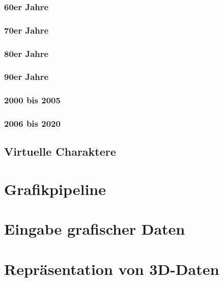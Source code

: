 \documentclass[a4paper, 11pt, accentcolor = tud3b]{tudreport}
\begin{document}
				\subsubsection{60er Jahre} %

				\subsubsection{70er Jahre} %

				\subsubsection{80er Jahre} %

				\subsubsection{90er Jahre} %

				\subsubsection{2000 bis 2005} %

				\subsubsection{2006 bis 2020} %

			\subsection{Virtuelle Charaktere} %

		\section{Grafikpipeline} %

		\section{Eingabe grafischer Daten} %

		\section{Repräsentation von 3D-Daten} %
\end{document}
